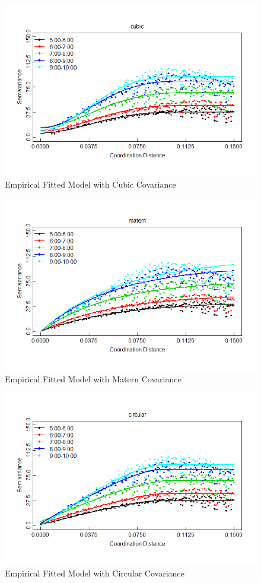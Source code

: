 \documentclass[hidelinks,12pt]{article}
\begin{document}
	\begin{figure}[!ht]
		\includegraphics[width=\textwidth]{semfit_cubic.png}
		\caption{Empirical Fitted Model with Cubic Covariance \label{fig:semcub}}
	\end{figure}
	\begin{figure}[!ht]
		\includegraphics[width=\textwidth]{semfit_matern.png}
		\caption{Empirical Fitted Model with Matern Covariance \label{fig:semmat}}
	\end{figure}
	\begin{figure}[!ht]
		\includegraphics[width=\textwidth]{semfit_circular.png}
		\caption{Empirical Fitted Model with Circular Covariance \label{fig:semcirh}}
	\end{figure}
\end{document}
